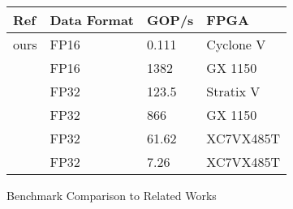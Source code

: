 \begin{figure}
	\centering
	\small
	\begin{tabular}{ |p{1.5cm}|p{3cm}|p{3cm}|p{3cm}|  }
		\hline
		Ref & Data Format & GOP/s & FPGA\\
		\hline
		ours & FP16      & 0.111      & Cyclone V \\
		\cite{aydonat2017opencl} & FP16      & 1382      & GX 1150 \\
		\cite{zhang2017frequency}  & FP32     & 123.5    & Stratix V \\
		\cite{zhang2017improving}  & FP32     & 866    & GX 1150 \\
		\cite{zhang2015optimizing}  & FP32    & 61.62    & XC7VX485T \\
		\cite{guan2017fpga}  & FP32   & 7.26  & XC7VX485T\\
		\hline
	\end{tabular}
	\label{result_others}
	\caption{Benchmark Comparison to Related Works}
\end{figure}


